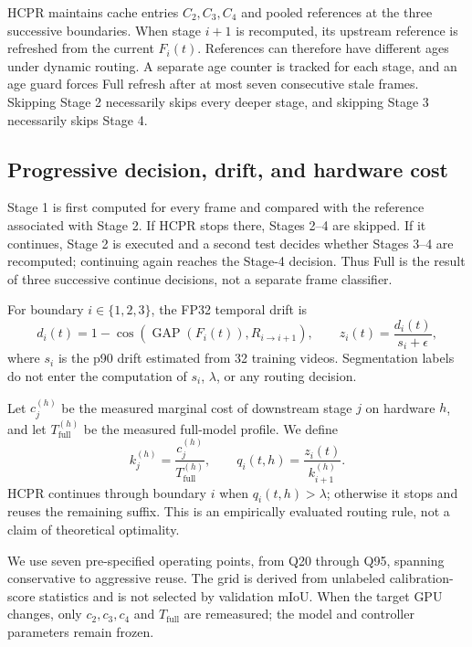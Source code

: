 \documentclass[runningheads]{llncs}
\begin{document}
HCPR maintains cache entries $C_2,C_3,C_4$ and pooled references at the three successive boundaries. When stage $i+1$ is recomputed, its upstream reference is refreshed from the current $F_i(t)$. References can therefore have different ages under dynamic routing. A separate age counter is tracked for each stage, and an age guard forces Full refresh after at most seven consecutive stale frames. Skipping Stage 2 necessarily skips every deeper stage, and skipping Stage 3 necessarily skips Stage 4.

\subsection{Progressive decision, drift, and hardware cost}
Stage 1 is first computed for every frame and compared with the reference associated with Stage 2. If HCPR stops there, Stages 2--4 are skipped. If it continues, Stage 2 is executed and a second test decides whether Stages 3--4 are recomputed; continuing again reaches the Stage-4 decision. Thus Full is the result of three successive continue decisions, not a separate frame classifier.

For boundary $i\in\{1,2,3\}$, the FP32 temporal drift is
\begin{equation}
d_i(t)=1-\cos(\operatorname{GAP}(F_i(t)),R_{i\rightarrow i+1}),\qquad
z_i(t)=\frac{d_i(t)}{s_i+\epsilon},
\end{equation}
where $s_i$ is the p90 drift estimated from 32 training videos. Segmentation labels do not enter the computation of $s_i$, $\lambda$, or any routing decision.

Let $c_j^{(h)}$ be the measured marginal cost of downstream stage $j$ on hardware $h$, and let $T_{\mathrm{full}}^{(h)}$ be the measured full-model profile. We define
\begin{equation}
k_j^{(h)}=\frac{c_j^{(h)}}{T_{\mathrm{full}}^{(h)}},\qquad
q_i(t,h)=\frac{z_i(t)}{k_{i+1}^{(h)}}.
\end{equation}
HCPR continues through boundary $i$ when $q_i(t,h)>\lambda$; otherwise it stops and reuses the remaining suffix. This is an empirically evaluated routing rule, not a claim of theoretical optimality.

We use seven pre-specified operating points, from Q20 through Q95, spanning conservative to aggressive reuse. The grid is derived from unlabeled calibration-score statistics and is not selected by validation mIoU. When the target GPU changes, only $c_2,c_3,c_4$ and $T_{\mathrm{full}}$ are remeasured; the model and controller parameters remain frozen.
\end{document}
